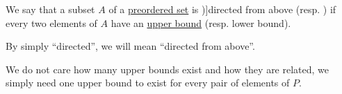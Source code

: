 \begin{definition}\label{def:directed_set}
  We say that a subset \( A \) of a \hyperref[def:preordered_set]{preordered set} is \term[bg=насочено надясно (множество) (\cite[10]{Проданов1982ФункционаленАнализЧаст1})]{directed from above} (resp. ) if every two elements of \( A \) have an \hyperref[def:extremal_points/bounds]{upper bound} (resp. lower bound).

  By simply \enquote{directed}, we will mean \enquote{directed from above}.
\end{definition}
\begin{comments}
  \item We do not care how many upper bounds exist and how they are related, we simply need one upper bound to exist for every pair of elements of \( P \).
\end{comments}


